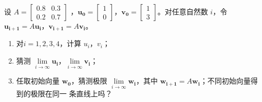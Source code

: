 	\newpage
	\begin{exercise}[1.2.3]
		设 $A= \begin{bmatrix}
			0.8&0.3\\0.2&0.7
		\end{bmatrix}$ ，$\boldsymbol{u_0}=\begin{bmatrix}
			1\\0
		\end{bmatrix}$，$\boldsymbol{v_0}=\begin{bmatrix}
			1\\3
		\end{bmatrix}$。对任意自然数 $i$，令 $\boldsymbol{u_{i+1}}=A\boldsymbol{u_i}$，$\boldsymbol{v_{i+1}}=A\boldsymbol{v_i}$。
		\begin{enumerate}
			\item 对$i=1,2,3,4$，计算 $u_i$，$v_i$；
			\item 猜测 $\lim\limits_{i\rightarrow\infty} \boldsymbol{u_i}$，$\lim\limits_{i\rightarrow\infty}\boldsymbol{v_i}$；
			\item 任取初始向量 $\boldsymbol{w_0}$，猜测极限 $\lim\limits_{i\rightarrow\infty}\boldsymbol{w_i}$，其中 $\boldsymbol{w_{i+1}}=A\boldsymbol{w_i}$；不同初始向量得到的极限在同一
			条直线上吗？
		\end{enumerate}
	\end{exercise}
